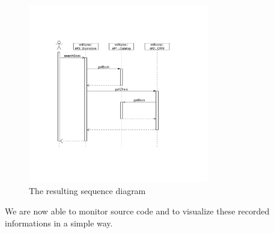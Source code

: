 \documentclass[a4paper, oneside, 11pt]{scrartcl}
\begin{document}
	\begin{figure}[H]
	  \begin{center}
	    \includegraphics[width=0.7\textwidth]{sequenceDiagram.pdf}
            \caption{The resulting sequence diagram}
	    \label{image:sequencediagram}
	  \end{center}
	\end{figure}
	We are now able to monitor source code and to visualize these recorded informations in a simple way.
\end{document}
